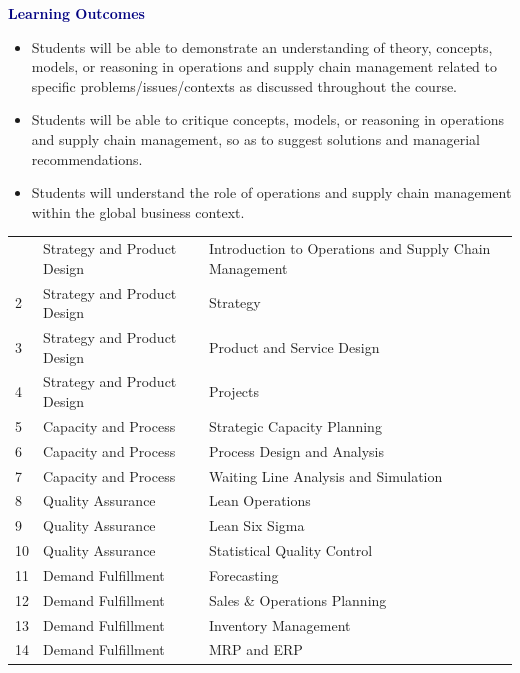 \begin{minipage}[t]{.66\textwidth}\vspace{0pt}
\textcolor{navy}{\large\bfseries Learning Outcomes}\par
\begin{itemize}
\item Students will be able to demonstrate an understanding of theory, concepts, models, or reasoning in operations and supply chain management related to specific problems/issues/contexts as discussed throughout the course.
\item Students will be able to critique concepts, models, or reasoning in operations and supply chain management, so as to suggest solutions and managerial recommendations.
\item Students will understand the role of operations and supply chain management within the global business context.
\end{itemize}
\end{minipage}\hfill
\begin{minipage}[t]{.32\textwidth}\vspace{0pt}
\end{minipage}
\begin{tabularx}{\textwidth}{M{1.8cm}YY}&Strategy and Product Design&Introduction to Operations and Supply Chain Management\\
2&Strategy and Product Design&Strategy\\
3&Strategy and Product Design&Product and Service Design\\
4&Strategy and Product Design&Projects\\
5&Capacity and Process&Strategic Capacity Planning\\
6&Capacity and Process&Process Design and Analysis\\
7&Capacity and Process&Waiting Line Analysis and Simulation\\
8&Quality Assurance&Lean Operations\\
9&Quality Assurance&Lean Six Sigma\\
10&Quality Assurance&Statistical Quality Control\\
11&Demand Fulfillment&Forecasting\\
12&Demand Fulfillment&Sales \& Operations Planning\\
13&Demand Fulfillment&Inventory Management\\
14&Demand Fulfillment&MRP and ERP\\
\end{tabularx}
